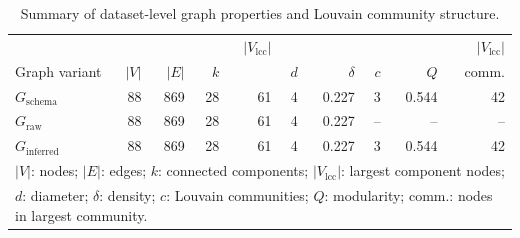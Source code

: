 \begin{table}[h]
\caption{Summary of dataset-level graph properties and Louvain community structure.}
\label{tab:graph_summary}
\centering
\small
\begin{tabular}{l r r r r r r r r r}
\toprule
 & & & & $|V_{\text{lcc}}|$ & & & & & $|V_{\text{lcc}}|$ \\
Graph variant
 & $|V|$ & $|E|$ & $k$ & & $d$ & $\delta$ & $c$ & $Q$ & {\small comm.} \\
\midrule
$G_{\text{schema}}$   & 88 & 869 & 28 & 61 & 4 & 0.227 & 3 & 0.544 & 42 \\
$G_{\text{raw}}$      & 88 & 869 & 28 & 61 & 4 & 0.227 & -- & -- & -- \\
$G_{\text{inferred}}$ & 88 & 869 & 28 & 61 & 4 & 0.227 & 3 & 0.544 & 42 \\
\bottomrule
\multicolumn{10}{l}{\scriptsize $|V|$: nodes; $|E|$: edges; $k$: connected components;
$|V_{\text{lcc}}|$: largest component nodes;} \\
\multicolumn{10}{l}{\scriptsize $d$: diameter; $\delta$: density;
$c$: Louvain communities; $Q$: modularity; comm.: nodes in largest community.}
\end{tabular}
\end{table}
